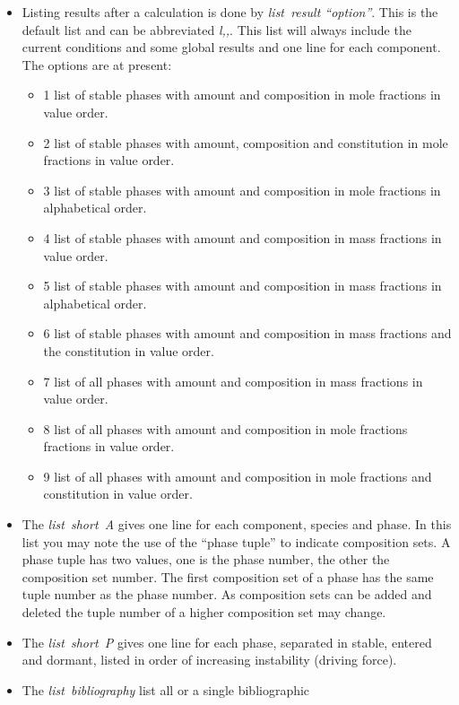 \documentclass[12pt]{article}
\begin{document}
\begin{itemize}
\item Listing results after a calculation is done by {\em list~result
  ``option''}.  This is the default list and can be abbreviated {\em
  l,,}.  This list will always include the current conditions and some
  global results and one line for each component.  The options are at
  present:
  \begin{itemize}
    \item 1 list of stable phases with amount and composition in mole
      fractions in value order.
    \item 2 list of stable phases with amount, composition and
      constitution in mole fractions in value order.
    \item 3 list of stable phases with amount and composition in mole
      fractions in alphabetical order.
    \item 4 list of stable phases with amount and composition in
      mass fractions in value order.
    \item 5 list of stable phases with amount and composition in
      mass fractions in alphabetical order.
    \item 6 list of stable phases with amount and composition in
      mass fractions and the constitution in value order.
    \item 7 list of all phases with amount and composition in
      mass fractions in value order.
    \item 8 list of all phases with amount and composition in
      mole fractions fractions in value order.
    \item 9 list of all phases with amount and composition in
      mole fractions and constitution in value order.
  \end{itemize}
\item The {\em list~short~A} gives one line for each component,
  species and phase.  In this list you may note the use of the ``phase
  tuple'' to indicate composition sets.  A phase tuple has two values,
  one is the phase number, the other the composition set number.  The
  first composition set of a phase has the same tuple number as the
  phase number.  As composition sets can be added and deleted the
  tuple number of a higher composition set may change.
\item The {\em list~short~P} gives one line for each phase, separated
  in stable, entered and dormant, listed in order of increasing
  instability (driving force).
\item The {\em list~bibliography} list all or a single bibliographic

\end{itemize}
\end{document}
